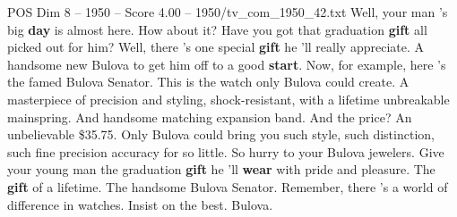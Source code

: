 \begin{textsample}{POS Dim 8 – 1950 – Score 4.00 – 1950/tv\_com\_1950\_42.txt}  \label{ex:f8_pos_002}
Well, your man 's big \textbf{day} is almost here.
How about it?
Have you got that graduation \textbf{gift} all picked out for him?
Well, there 's one special \textbf{gift} he 'll really appreciate.
A handsome new Bulova to get him off to a good \textbf{start}.
Now, for example, here 's the famed Bulova Senator.
This is the watch only Bulova could create.
A masterpiece of precision and styling, shock-resistant, with a lifetime unbreakable mainspring.
And handsome matching expansion band.
And the price?
An unbelievable \$35.75.
Only Bulova could bring you such style, such distinction, such fine precision accuracy for so little.
So hurry to your Bulova jewelers.
Give your young man the graduation \textbf{gift} he 'll \textbf{wear} with pride and pleasure.
The \textbf{gift} of a lifetime.
The handsome Bulova Senator.
Remember, there 's a world of difference in watches.
Insist on the best.
Bulova.

\end{textsample}
